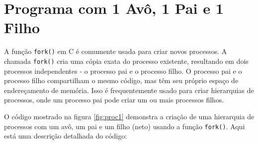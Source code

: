 \documentclass[
	12pt,				%
	openright,			%
	oneside,			%
	a4paper,			%
	chapter=TITLE,		%
	english,			%
	french,				%
	spanish,			%
	brazil				%
	]{abntex2}
\theoremstyle{definition}
\begin{document}

\section{Programa com 1 Avô, 1 Pai e 1 Filho}


A função \texttt{fork()} em C é comumente usada para criar novos processos. 
A chamada \texttt{fork()} cria uma cópia exata do processo existente, 
resultando em dois processos independentes - o processo pai e o processo filho. 
O processo pai e o processo filho compartilham o mesmo código, mas têm 
seu próprio espaço de endereçamento de memória. Isso é frequentemente usado 
para criar hierarquias de processos, onde um processo pai pode criar um ou 
mais processos filhos.

O código mostrado na figura \ref{fig:proc1} demonstra a criação de uma hierarquia de processos 
com um avô, um pai e um filho (neto) usando a função \texttt{fork()}. 
Aqui está uma descrição detalhada do código:
\end{document}

